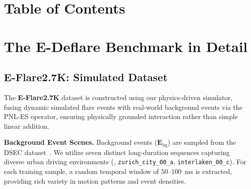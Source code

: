 \clearpage
\onecolumn
\raggedbottom
\setcounter{section}{0}
\renewcommand{\thesection}{\Alph{section}}
\maketitlesupplementary

\section*{Table of Contents}
\startcontents[appendices]

\clearpage


\section{The E-Deflare Benchmark in Detail}
\label{app:benchmark_details}

\subsection{E-Flare2.7K: Simulated Dataset}
\label{app:eflare_details}

The \textbf{E-Flare2.7K} dataset is constructed using our physics-driven simulator, fusing dynamic simulated flare events with real-world background events via the PNL-ES operator, ensuring physically grounded interaction rather than simple linear addition.

\noindent\textbf{Background Event Scenes.}
Background events ($\mathbf{E}_{\mathrm{bg}}$) are sampled from the DSEC dataset~\cite{gehrig2021dsec}. We utilize seven distinct long-duration sequences capturing diverse urban driving environments (\eg, \texttt{zurich\_city\_00\_a}, \texttt{interlaken\_00\_c}). For each training sample, a random temporal window of $50$--$100$~ms is extracted, providing rich variety in motion patterns and event densities.

